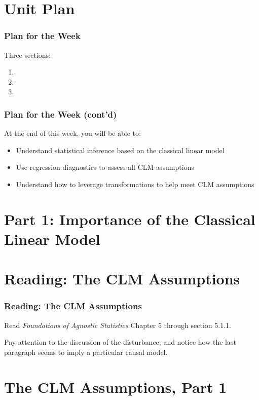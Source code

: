 \documentclass[12pt, block=fill]{beamer}
\begin{document}
\section{Unit Plan}

\begin{frame}
  \frametitle{Plan for the Week}
 
  
  Three sections:
  \begin{enumerate}
  \item 
  \item 
  \item
  \end{enumerate}
\end{frame}

\begin{frame}
  \frametitle{Plan for the Week (cont'd)}
  At the end of this week, you will be able to:
  \begin{itemize}
  \item Understand statistical inference based on the classical linear model
  \item Use regression diagnostics to assess all CLM assumptions
  \item Understand how to leverage transformations to help meet CLM assumptions
  \end{itemize}
\end{frame}

\section{Part 1: Importance of the Classical Linear Model}


\section{Reading: The CLM Assumptions}

\begin{frame}
  \frametitle{Reading: The CLM Assumptions}
  Read \textit{Foundations of Agnostic Statistics} Chapter 5 through section 5.1.1.
  
  Pay attention to the discussion of the disturbance, and notice how the last paragraph seems to imply a particular causal model. 
  \end{frame}


\section{The CLM Assumptions, Part 1}
\end{document}
